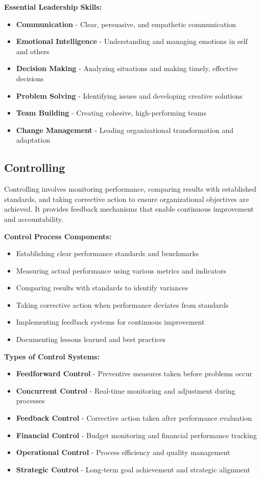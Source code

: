 \documentclass[12pt]{article}
\begin{document}
\textbf{Essential Leadership Skills:}
\begin{itemize}
    \item \textbf{Communication} - Clear, persuasive, and empathetic communication
    \item \textbf{Emotional Intelligence} - Understanding and managing emotions in self and others
    \item \textbf{Decision Making} - Analyzing situations and making timely, effective decisions
    \item \textbf{Problem Solving} - Identifying issues and developing creative solutions
    \item \textbf{Team Building} - Creating cohesive, high-performing teams
    \item \textbf{Change Management} - Leading organizational transformation and adaptation
\end{itemize}

\subsection{Controlling}
Controlling involves monitoring performance, comparing results with established standards, and taking corrective action to ensure organizational objectives are achieved. It provides feedback mechanisms that enable continuous improvement and accountability.

\textbf{Control Process Components:}
\begin{itemize}
    \item Establishing clear performance standards and benchmarks
    \item Measuring actual performance using various metrics and indicators
    \item Comparing results with standards to identify variances
    \item Taking corrective action when performance deviates from standards
    \item Implementing feedback systems for continuous improvement
    \item Documenting lessons learned and best practices
\end{itemize}

\textbf{Types of Control Systems:}
\begin{itemize}
    \item \textbf{Feedforward Control} - Preventive measures taken before problems occur
    \item \textbf{Concurrent Control} - Real-time monitoring and adjustment during processes
    \item \textbf{Feedback Control} - Corrective action taken after performance evaluation
    \item \textbf{Financial Control} - Budget monitoring and financial performance tracking
    \item \textbf{Operational Control} - Process efficiency and quality management
    \item \textbf{Strategic Control} - Long-term goal achievement and strategic alignment
\end{itemize}
\end{document}
